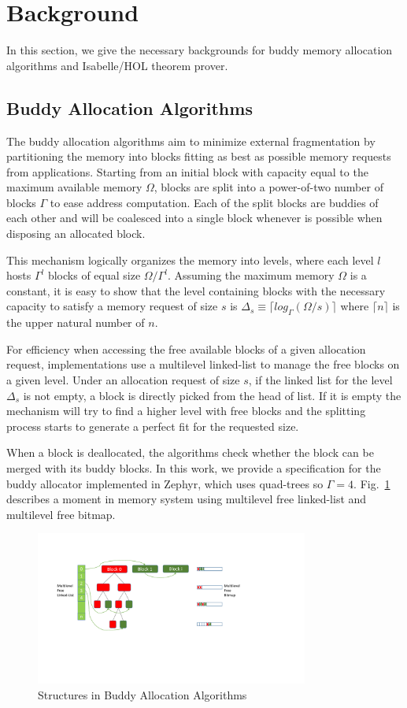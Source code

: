 \section{Background}
In this section, we give the necessary backgrounds for buddy memory allocation algorithms and Isabelle/HOL theorem prover.

\subsection{Buddy Allocation Algorithms}\label{sec:buddy}
The buddy allocation algorithms aim to minimize external fragmentation by partitioning the memory into blocks fitting as best as possible memory requests from applications. Starting from an initial block with capacity equal to the maximum available memory $\Omega$, blocks are split into a power-of-two number of blocks $\Gamma$ to ease address computation. Each of the split blocks are buddies of each other and will be coalesced into a single block whenever is possible when disposing an allocated block.

This mechanism logically organizes the memory into levels, where each level $l$ hosts $\Gamma^l$ blocks of equal size $\Omega/{\Gamma}^l$. Assuming the maximum memory $\Omega$ is a constant, it is easy to show that the level containing blocks with the necessary capacity to satisfy a memory request of size $s$ is $\Delta_s \equiv \lceil log_\Gamma (\Omega / s) \rceil$ where $\lceil n \rceil$ is the upper natural number of $n$.

For efficiency when accessing the free available blocks of a given allocation request, implementations use a multilevel linked-list to manage the free blocks on a given level. Under an allocation request of size $s$, if the linked list for the level $\Delta_s$ is not empty, a block is directly picked from the head of list. If it is empty the mechanism will try to find a higher level with free blocks and the splitting process starts to generate a perfect fit for the requested size.

When a block is deallocated, the algorithms check whether the block can be merged with its buddy blocks. In this work, we provide a specification for the buddy allocator implemented in Zephyr, which uses quad-trees so $\Gamma = 4$.  Fig.~\ref{fig3} describes a moment in memory system using multilevel free linked-list and multilevel free bitmap.

\begin{figure}[htbp]
	\centering
	\includegraphics[width=0.8\textwidth]{fig3.pdf}
	\caption{Structures in Buddy Allocation Algorithms}
	\label{fig3}
\end{figure}

